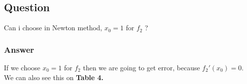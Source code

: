 \documentclass[11pt]{article}
\begin{document}
\subsection{Question}
Can i choose in Newton method, $x_0 = 1$ for $f_2$ ? 
\subsubsection*{Answer}
If we choose $x_0=1$ for $f_2$ then we are going to get error, because $f_2'(x_0) = 0$. We can also see this on \textbf{Table 4.}
\end{document}
